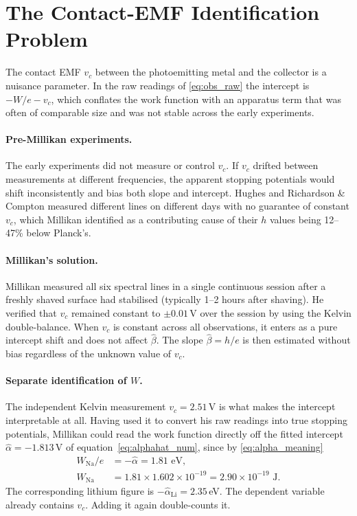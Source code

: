 \documentclass[12pt]{article}
\begin{document}
\section{The Contact-EMF Identification Problem}
\label{sec:contact}

The contact EMF $v_c$ between the photoemitting metal and the collector is a
nuisance parameter.  In the raw readings of \eqref{eq:obs_raw} the intercept
is $-W/e-v_c$, which conflates the work function with an apparatus term that
was often of comparable size and was not stable across the early experiments.

\paragraph{Pre-Millikan experiments.}  The early experiments did not measure
or control $v_c$.  If $v_c$ drifted between measurements at different
frequencies, the apparent stopping potentials would shift inconsistently and
bias both slope and intercept.  Hughes and Richardson \& Compton
measured different lines on different days with no guarantee of constant $v_c$,
which Millikan \citeyearpar{Millikan1916} identified as a contributing cause
of their $h$ values being 12--47\% below Planck's.

\paragraph{Millikan's solution.}  Millikan measured all six spectral lines
in a single continuous session after a freshly shaved surface had stabilised
(typically 1--2 hours after shaving).  He verified that $v_c$ remained constant
to $\pm 0.01$\,V over the session by using the Kelvin double-balance.  When
$v_c$ is constant across all observations, it enters as a pure intercept shift
and does not affect $\hat\beta$.  The slope $\hat\beta = h/e$ is then estimated
without bias regardless of the unknown value of $v_c$.

\paragraph{Separate identification of $W$.}  The independent Kelvin
measurement $v_c = 2.51$\,V is what makes the intercept interpretable at all.
Having used it to convert his raw readings into true stopping potentials,
Millikan could read the work function directly off the fitted intercept
$\hat\alpha = -1.813$\,V of equation~\eqref{eq:alphahat_num}, since by
\eqref{eq:alpha_meaning}
\begin{align*}
  W_{\mathrm{Na}}/e &= -\hat\alpha = 1.81\text{ eV},\\
  W_{\mathrm{Na}} &= 1.81\times1.602\times10^{-19}
    = 2.90\times10^{-19}\text{ J}.
\end{align*}
The corresponding lithium figure is $-\hat\alpha_{\mathrm{Li}} = 2.35$\,eV.
The dependent variable already contains $v_c$.  Adding it again double-counts
it.
\end{document}
